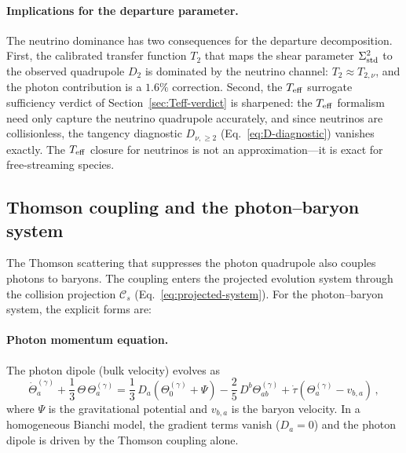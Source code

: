 \paragraph{Implications for the departure parameter.}

The neutrino dominance has two consequences for the
departure decomposition.  First, the calibrated transfer
function $T_2$ that maps the shear parameter $\Sigma^2_{\mathrm{std}}$
to the observed quadrupole $D_2$ is dominated by the
neutrino channel: $T_2 \approx T_{2,\nu}$, and the
photon contribution is a $1.6\%$ correction.  Second, the
$T_{\mathrm{eff}}$ surrogate sufficiency verdict of
Section~\ref{sec:Teff-verdict} is sharpened: the $T_{\mathrm{eff}}$
formalism need only capture the neutrino quadrupole
accurately, and since neutrinos are collisionless, the
tangency diagnostic $D_{\nu,\geq 2}$
(Eq.~\ref{eq:D-diagnostic}) vanishes exactly.  The
$T_{\mathrm{eff}}$ closure for neutrinos is not an approximation---it
is exact for free-streaming species.


\subsection{Thomson coupling and the photon--baryon system}
\label{sec:thomson-coupling}

The Thomson scattering that suppresses the photon
quadrupole also couples photons to baryons.  The
coupling enters the projected evolution system through
the collision projection $\mathcal{C}_s$
(Eq.~\ref{eq:projected-system}).  For the photon--baryon
system, the explicit forms are:

\paragraph{Photon momentum equation.}

The photon dipole (bulk velocity) evolves as
\begin{equation}\label{eq:photon-dipole}
\dot{\Theta}^{(\gamma)}_a
+ \frac{1}{3}\,\Theta\, \Theta^{(\gamma)}_a
= \frac{1}{3}\, D_a\!\left(
  \Theta^{(\gamma)}_0 + \Psi
\right)
- \frac{2}{5}\, D^b \Theta^{(\gamma)}_{ab}
+ \dot{\tau}\left(
  \Theta^{(\gamma)}_a - v_{b,a}
\right)\,,
\end{equation}
where $\Psi$ is the gravitational potential and
$v_{b,a}$ is the baryon velocity.  In a homogeneous
Bianchi model, the gradient terms vanish ($D_a = 0$)
and the photon dipole is driven by the Thomson
coupling alone.


